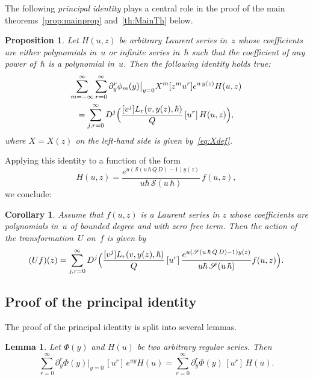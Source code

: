\documentclass[11pt]{article}
\let\mathcal\mathscr
\theoremstyle{plain}
\newtheorem{proposition}[theorem]{Proposition}
\newtheorem{corollary}[theorem]{Corollary}
\newtheorem{lemma}[theorem]{Lemma}
\theoremstyle{definition}
\theoremstyle{remark}
\newcommand{\cS}{\mathcal{S}}
\begin{document}
The following \emph{principal identity} plays a central role in the proof of the main theorems~\ref{prop:mainprop} and~\ref{th:MainTh} below.
\begin{proposition}\label{prop:principal}
Let $H(u,z)$ be arbitrary Laurent series in~$z$ whose coefficients are either polynomials in~$u$ or infinite series in~$\hbar$ such that the coefficient of any power of~$\hbar$ is a polynomial in~$u$. Then the following identity holds true:
\begin{multline}\label{eq:princid}
\sum_{m=-\infty}^\infty \sum_{r=0}^\infty \partial_y^{r}\phi_{m}(y)\big|_{y=0}
X^m[z^m u^r]e^{u\,y(z)}H(u,z)\\
=\sum_{j,r=0}^\infty D^j\Bigl(\frac{[v^j]L_r(v,y(z),\hbar)}{Q}\,[u^r]\, H(u,z)\Bigr),
\end{multline}
where $X=X(z)$ on the left-hand side is given by~\eqref{eq:Xdef}.
\end{proposition}

Applying this identity to a function of the form
\[
H(u,z)=\frac{e^{u(\cS(u\,\hbar\,Q\,D)-1)y(z)}}{u\hbar\,\cS(u\,\hbar)}\,f(u,z),
\]
we conclude:

\begin{corollary}\label{cor:principal}
Assume that $f(u,z)$ is a Laurent series in $z$ whose coefficients are polynomials in~$u$ of bounded degree and with zero free term. Then the action of the transformation~$U$ on~$f$ is given by
\begin{equation}\label{eq:principal}
(U f)(z)=\sum_{j,r=0}^\infty D^j\Bigl(\frac{[v^j]L_r(v,y(z),\hbar)}{Q}\,[u^r]\, \frac{e^{u(\cS(u\,\hbar\,Q\,D)-1)y(z)}}{u\hbar\,\cS(u\,\hbar)}f(u,z)\Bigr).
\end{equation}
\end{corollary}

\subsection{Proof of the principal identity}
The proof of the principal identity is split into several lemmas.

\begin{lemma}\label{lem:L1}
Let $\Phi(y)$ and $H(u)$ be two arbitrary regular series. Then
\begin{equation}\label{eq:L1}
\sum_{r=0}^\infty \partial_y^r\Phi(y)\big|_{y=0} \,[u^r]\,e^{u y}H(u)=
\sum_{r=0}^\infty \partial_y^r\Phi(y) \,[u^r]\, H(u).
\end{equation}
\end{lemma}
\end{document}
